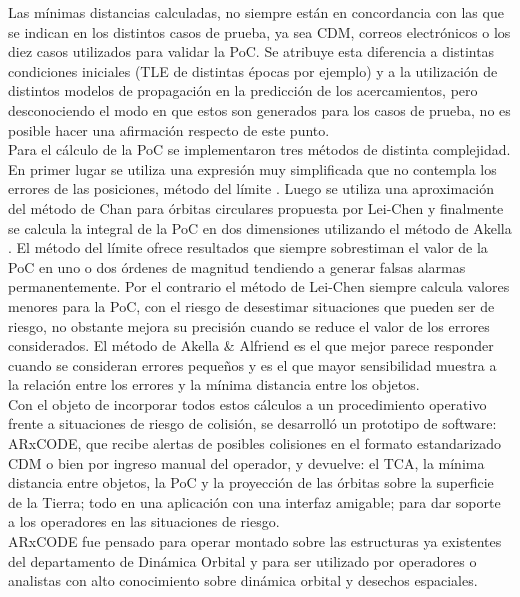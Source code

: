 Las m\'inimas distancias calculadas, no siempre est\'an en concordancia con las que se indican en los distintos casos de prueba, ya sea CDM, correos electr\'onicos o los diez casos utilizados para validar la PoC. Se atribuye esta diferencia a distintas condiciones iniciales (TLE de distintas \'epocas por ejemplo) y a la utilizaci\'on de distintos modelos de propagaci\'on en la predicci\'on de los acercamientos, pero desconociendo el modo en que estos son generados para los casos de prueba, no es posible hacer una afirmaci\'on respecto de este punto.\\ 

Para el c\'alculo de la PoC se implementaron tres m\'etodos de distinta complejidad. En primer lugar se utiliza una expresi\'on muy simplificada que no contempla los errores de las posiciones, m\'etodo del l\'imite  \citep{alfano2008method}. Luego se utiliza una aproximaci\'on del m\'etodo de Chan \citep{chan2003improved} para \'orbitas circulares propuesta por Lei-Chen \citep{leichen} y finalmente se calcula la integral de la PoC en dos dimensiones utilizando el m\'etodo de Akella \citep{akellaAlfriend}. El m\'etodo del l\'imite ofrece resultados que siempre sobrestiman el valor de la PoC en uno o dos \'ordenes de magnitud tendiendo a generar falsas alarmas permanentemente. Por el contrario el m\'etodo de Lei-Chen siempre calcula valores menores para la PoC, con el riesgo de desestimar situaciones que pueden ser de riesgo, no obstante mejora su precisi\'on cuando se reduce el valor de los errores considerados. El m\'etodo de Akella \& Alfriend es el que mejor parece responder cuando se consideran errores peque\~nos y es el que mayor sensibilidad muestra a la relaci\'on entre los errores y la m\'inima distancia entre los objetos.\\

Con el objeto de incorporar todos estos c\'alculos a un procedimiento operativo frente a situaciones de riesgo de colisi\'on, se desarroll\'o un prototipo de software: ARxCODE, que recibe alertas de posibles colisiones en el formato estandarizado CDM o bien por ingreso manual del operador, y devuelve: el TCA, la m\'inima distancia entre objetos, la PoC y la proyecci\'on de las \'orbitas sobre la superficie de la Tierra; todo en una aplicaci\'on con una interfaz amigable; para dar soporte a los operadores en las situaciones de riesgo.\\

ARxCODE fue pensado para operar montado sobre las estructuras ya existentes del departamento de Din\'amica Orbital y para ser utilizado por operadores o analistas con alto conocimiento sobre din\'amica orbital y desechos espaciales.\\

